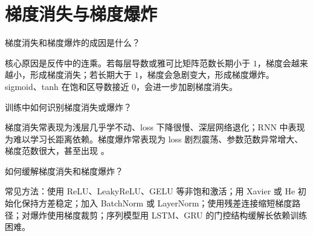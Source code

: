 \section{梯度消失与梯度爆炸}
\begin{interview}
梯度消失和梯度爆炸的成因是什么？
\end{interview}
\begin{answer}
核心原因是反传中的连乘。若每层导数或雅可比矩阵范数长期小于 $1$，梯度会越来越小，形成梯度消失；若长期大于 $1$，梯度会急剧变大，形成梯度爆炸。sigmoid、tanh 在饱和区导数接近 $0$，会进一步加剧梯度消失。
\end{answer}
\begin{interview}
训练中如何识别梯度消失或爆炸？
\end{interview}
\begin{answer}
梯度消失常表现为浅层几乎学不动、loss 下降很慢、深层网络退化；RNN 中表现为难以学习长距离依赖。梯度爆炸常表现为 loss 剧烈震荡、参数范数异常增大、梯度范数很大，甚至出现 。
\end{answer}
\begin{interview}
如何缓解梯度消失和梯度爆炸？
\end{interview}
\begin{answer}
常见方法：使用 ReLU、LeakyReLU、GELU 等非饱和激活；用 Xavier 或 He 初始化保持方差稳定；加入 BatchNorm 或 LayerNorm；使用残差连接缩短梯度路径；对爆炸使用梯度裁剪；序列模型用 LSTM、GRU 的门控结构缓解长依赖训练困难。
\end{answer}
